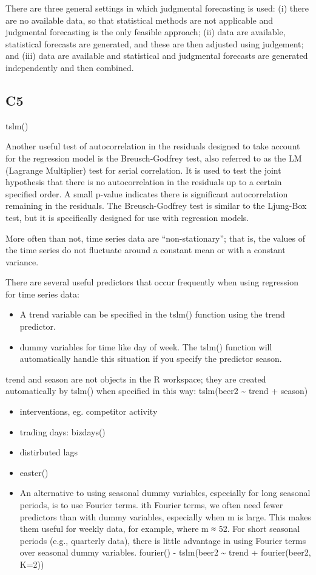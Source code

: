 \documentclass[]{book}
\begin{document}
There are three general settings in which judgmental forecasting is
used: (i) there are no available data, so that statistical methods are
not applicable and judgmental forecasting is the only feasible approach;
(ii) data are available, statistical forecasts are generated, and these
are then adjusted using judgement; and (iii) data are available and
statistical and judgmental forecasts are generated independently and
then combined.

\subsection{C5}\label{c5}

tslm()

Another useful test of autocorrelation in the residuals designed to take
account for the regression model is the Breusch-Godfrey test, also
referred to as the LM (Lagrange Multiplier) test for serial correlation.
It is used to test the joint hypothesis that there is no autocorrelation
in the residuals up to a certain specified order. A small p-value
indicates there is significant autocorrelation remaining in the
residuals. The Breusch-Godfrey test is similar to the Ljung-Box test,
but it is specifically designed for use with regression models.

More often than not, time series data are ``non-stationary''; that is,
the values of the time series do not fluctuate around a constant mean or
with a constant variance.

There are several useful predictors that occur frequently when using
regression for time series data:

\begin{itemize}
\item
  A trend variable can be specified in the tslm() function using the
  trend predictor.
\item
  dummy variables for time like day of week. The tslm() function will
  automatically handle this situation if you specify the predictor
  season.
\end{itemize}

trend and season are not objects in the R workspace; they are created
automatically by tslm() when specified in this way: tslm(beer2
\textasciitilde{} trend + season)

\begin{itemize}
\item
  interventions, eg. competitor activity
\item
  trading days: bizdays()
\item
  distirbuted lags
\item
  easter()
\item
  An alternative to using seasonal dummy variables, especially for long
  seasonal periods, is to use Fourier terms. ith Fourier terms, we often
  need fewer predictors than with dummy variables, especially when m is
  large. This makes them useful for weekly data, for example, where m ≈
  52. For short seasonal periods (e.g., quarterly data), there is little
  advantage in using Fourier terms over seasonal dummy variables.
  fourier() - tslm(beer2 \textasciitilde{} trend + fourier(beer2, K=2))
\end{itemize}
\end{document}
